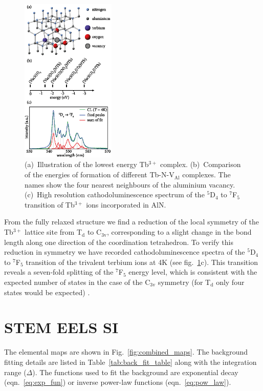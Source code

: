 \documentclass[%
 aip,
rsi,%
 amsmath,amssymb,
 reprint,%
]{revtex4-1}
\begin{document}
\begin{figure}[!ht]
	\includegraphics[width=0.4\textwidth]{model}
    \caption{(a)~Illustration of the lowest energy Tb$^{3+}$ complex. (b)~Comparison of the energies of formation of different Tb-N-V$_\text{Al}$ complexes. The names show the four nearest neighbours of the aluminium vacancy. (c)~High resolution cathodoluminescence spectrum of the $^5$D$_4$ to $^7$F$_5$ transition of Tb$^{3+}$ ions incorporated in AlN.}
    \label{fig:felix_model}
\end{figure}
From the fully relaxed structure we find a reduction of the local symmetry of the Tb$^{3+}$ lattice site from T$_\text{d}$ to C$_\text{3v}$, corresponding to a slight change in the bond length along one direction of the coordination tetrahedron. To verify this reduction in symmetry we have recorded cathodoluminescence spectra of the $^5$D$_4$ to $^7$F$_5$ transition of the trivalent terbium ions at 4K (see fig.~\ref{fig:felix_model}c). This transition reveals a seven-fold splitting of the $^7$F$_5$ energy level, which is consistent with the expected number of states in the case of the C$_\text{3v}$ symmetry (for T$_\text{d}$ only four states would be expected) \cite{henderson05}.

\section{STEM EELS SI}
\label{sec:STEMEELSSI}
The elemental maps are shown in Fig.~\ref{fig:combined_maps}. The background fitting details are listed in Table~\ref{tab:back_fit_table} along with the integration range ($\Delta$). The functions used to fit the background are exponential decay (eqn.~\ref{eq:exp_fun}) or inverse power-law functions (eqn.~\ref{eq:pow_law}).
\end{document}
